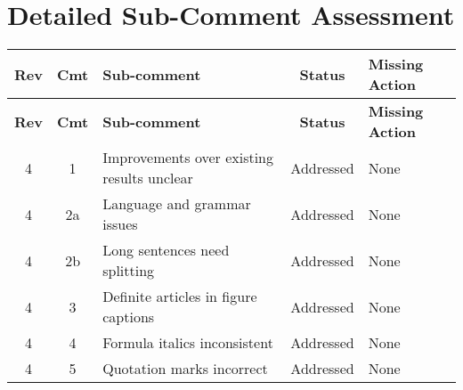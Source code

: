 \documentclass{article}
\begin{document}
\section*{Detailed Sub-Comment Assessment}

\begin{longtable}{|c|c|p{5cm}|c|p{4cm}|}
\hline
\textbf{Rev} & \textbf{Cmt} & \textbf{Sub-comment} & \textbf{Status} & \textbf{Missing Action} \\
\hline
\endfirsthead
\hline
\textbf{Rev} & \textbf{Cmt} & \textbf{Sub-comment} & \textbf{Status} & \textbf{Missing Action} \\
\hline
\endhead

4 & 1 & Improvements over existing results unclear & Addressed & None \\
\hline
4 & 2a & Language and grammar issues & Addressed & None \\
\hline
4 & 2b & Long sentences need splitting & Addressed & None \\
\hline
4 & 3 & Definite articles in figure captions & Addressed & None \\
\hline
4 & 4 & Formula italics inconsistent & Addressed & None \\
\hline
4 & 5 & Quotation marks incorrect & Addressed & None \\
\hline


\end{longtable}
\end{document}
